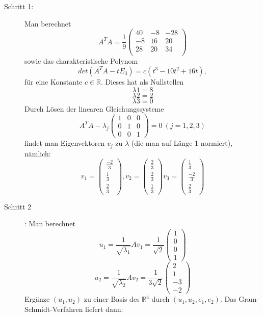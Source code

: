 \documentclass{scrbook}
\begin{document}
\begin{description}
\item[Schritt 1:]Man berechnet
\[A^TA = \frac{1}{9}\left(
\begin{array}{ccc}
40&-8 &-28\\
-8&16 &20\\
28&20 &34\\
\end{array}
\right)\]
sowie das charakteristische Polynom
\[det(A^TA -t E_3) = c(t^3-10 t^2 + 16 t),\]
für eine Konstante $c \in \mathbb{R}$. Dieses hat als Nullstellen
\[\lambda1 = 8\]
\[\lambda2 = 2\]
\[\lambda3 = 0\]
Durch Lösen der linearen Gleichungssysteme
\[A^TA - \lambda_j \left(
\begin{array}{ccc}
1&0&0\\
0&1&0\\
0&0&1
\end{array}
\right) = 0\ (j=1,2,3)\]
findet man Eigenvektoren $v_j$ zu $\lambda$ (die man auf Länge 1 normiert), nämlich:
\[
v_1 = \left(\begin{array}{c}
\frac{-2}{3}\\
\frac{1}{3}\\
\frac{2}{3}
\end{array}
\right),
v_2 = \left(\begin{array}{c}
\frac{2}{3}\\
\frac{2}{3}\\
\frac{1}{3}
\end{array}
\right)
v_3 = \left(\begin{array}{c}
\frac{1}{3}\\
\frac{-2}{3}\\
\frac{2}{3}
\end{array}
\right)
\]
\item[Schritt 2]: Man berechnet
\[u_1 = \frac{1}{\sqrt{\lambda_1}} A v_1 = \frac{1}{\sqrt{2}} \left(
\begin{array}{c}
1\\0\\0\\1
\end{array}
\right)\]
\[u_2 = \frac{1}{\sqrt{\lambda_2}} A v_2 = \frac{1}{3\sqrt{2}} \left(
\begin{array}{c}
2\\1\\-3\\-2
\end{array}
\right)\]
Ergänze $(u_1,u_2)$ zu einer Basis des $\mathbb{R}^4$ durch  $(u_1,u_2,e_1,e_2)$.
Das Gram-Schmidt-Verfahren liefert dann:

\end{description}
\end{document}

